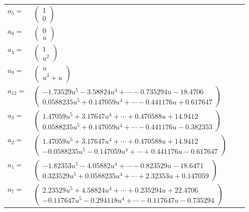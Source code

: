 \documentclass[1p]{elsarticle_modified}
\theoremstyle{definition}
\begin{document}
\begin{tabular}{m{7pt} m{180pt} m{7pt} m{180pt} }
\flushright $a_{5}=$&$\begin{pmatrix}1\\0\end{pmatrix}$ \\
\flushright $a_{8}=$&$\begin{pmatrix}0\\u\end{pmatrix}$ \\
\flushright $a_{4}=$&$\begin{pmatrix}1\\u^2\end{pmatrix}$ \\
\flushright $a_{9}=$&$\begin{pmatrix}u\\u^3+u\end{pmatrix}$ \\
\flushright $a_{12}=$&$\begin{pmatrix}-1.73529 u^{5}-3.58824 u^{4}+\cdots-0.735294 u-18.4706\\0.0588235 u^{5}+0.147059 u^{4}+\cdots-0.441176 u+0.617647\end{pmatrix}$ \\
\flushright $a_{3}=$&$\begin{pmatrix}1.47059 u^{5}+3.17647 u^{4}+\cdots+0.470588 u+14.9412\\0.0588235 u^{5}+0.147059 u^{4}+\cdots-0.441176 u-0.382353\end{pmatrix}$ \\
\flushright $a_{2}=$&$\begin{pmatrix}1.47059 u^{5}+3.17647 u^{4}+\cdots+0.470588 u+14.9412\\-0.0588235 u^{5}-0.147059 u^{4}+\cdots+0.441176 u-0.617647\end{pmatrix}$ \\
\flushright $a_{1}=$&$\begin{pmatrix}-1.82353 u^{5}-4.05882 u^{4}+\cdots-0.823529 u-18.6471\\0.323529 u^{5}+0.0588235 u^{4}+\cdots+2.32353 u+0.147059\end{pmatrix}$ \\
\flushright $a_{7}=$&$\begin{pmatrix}2.23529 u^{5}+4.58824 u^{4}+\cdots+0.235294 u+22.4706\\-0.117647 u^{5}-0.294118 u^{4}+\cdots-0.117647 u-0.735294\end{pmatrix}$ \\

\end{tabular}
\end{document}
